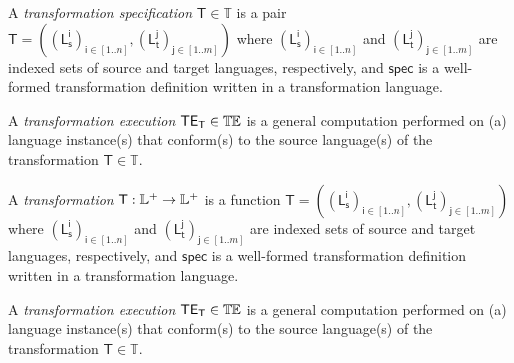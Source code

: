 \begin{olddef}
\begin{Definition}
   A \emph{transformation specification} $\mathsf{T}\in\mathbb{T}$ is a pair
$\mathsf{T} = ((\mathsf{L_s^{i}})_{\mathsf{i}\in [1..n]}, 
(\mathsf{L_t^{j}})_{\mathsf{j}\in[1..m]})$ where  
$(\mathsf{L_s^{i}})_{\mathsf{i}\in [1..n]}$ and
$(\mathsf{L_t^{j}})_{\mathsf{j}\in [1..m]}$ are indexed sets of source and
target languages, respectively, and $\mathsf{spec}$ is a well-formed 
transformation definition written in a transformation language.

   A \emph{transformation execution} $\mathsf{TE_{T}}\in\mathbb{T}\mskip-1mu\mathbb{E}$ is a general 
computation performed on (a) language instance(s) that conform(s) to the source 
language(s) of the transformation $\mathsf{T}\in\mathbb{T}$.
\end{Definition}
\end{olddef}
\begin{newdef}
\begin{Definition}
   A \emph{transformation} $\mathsf{T}: \mathbb{L}^+\rightarrow \mathbb{L}^+$ is a function 
$\mathsf{T} = ((\mathsf{L_s^{i}})_{\mathsf{i}\in [1..n]}, 
(\mathsf{L_t^{j}})_{\mathsf{j}\in[1..m]})$ where  
$(\mathsf{L_s^{i}})_{\mathsf{i}\in [1..n]}$ and
$(\mathsf{L_t^{j}})_{\mathsf{j}\in [1..m]}$ are indexed sets of source and
target languages, respectively, and $\mathsf{spec}$ is a well-formed 
transformation definition written in a transformation language.

   A \emph{transformation execution} $\mathsf{TE_{T}}\in\mathbb{T}\mskip-1mu\mathbb{E}$ is a general 
computation performed on (a) language instance(s) that conform(s) to the source 
language(s) of the transformation $\mathsf{T}\in\mathbb{T}$.
\end{Definition}
\end{newdef}



